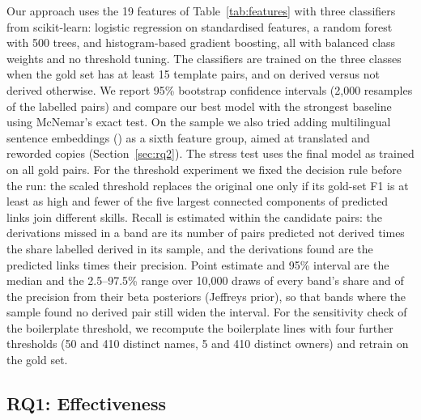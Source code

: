 \documentclass[sigconf,screen]{acmart}
\begin{document}
Our approach uses the 19 features of Table~\ref{tab:features} with three classifiers from scikit-learn: logistic regression on standardised features, a random forest with 500 trees, and histogram-based gradient boosting, all with balanced class weights and no threshold tuning. The classifiers are trained on the three classes when the gold set has at least 15 template pairs, and on derived versus not derived otherwise. We report 95\% bootstrap confidence intervals (2,000 resamples of the labelled pairs) and compare our best model with the strongest baseline using McNemar's exact test. On the sample we also tried adding multilingual sentence embeddings (\ResEmbModel{}) as a sixth feature group, aimed at translated and reworded copies (Section~\ref{sec:rq2}). The stress test uses the final model as trained on all gold pairs. For the threshold experiment we fixed the decision rule before the run: the scaled threshold replaces the original one only if its gold-set F1 is at least as high and fewer of the five largest connected components of predicted links join different skills. Recall is estimated within the candidate pairs: the derivations missed in a band are its number of pairs predicted not derived times the share labelled derived in its sample, and the derivations found are the predicted links times their precision. Point estimate and 95\% interval are the median and the 2.5--97.5\% range over 10,000 draws of every band's share and of the precision from their beta posteriors (Jeffreys prior), so that bands where the sample found no derived pair still widen the interval. For the sensitivity check of the boilerplate threshold, we recompute the boilerplate lines with four further thresholds (50 and 410 distinct names, 5 and 410 distinct owners) and retrain on the gold set.

\subsection{RQ1: Effectiveness}
\label{sec:rq1}

\begin{table}[t]
\caption{RQ1: detection of derived variants (pooled out-of-fold predictions; F1 $\pm$
standard deviation across folds). The last column is the share of non-derived pairs in bands
B1--B3 that a method labels as derived (lower is better).}
\label{tab:rq1}
\small
{}
\end{table}

\begin{table}[t]
\caption{RQ1 by similarity band: precision (P) and recall (R) of the strongest baseline and
of our best model.}
\label{tab:rq1bands}
\small
{}
\end{table}
\end{document}
